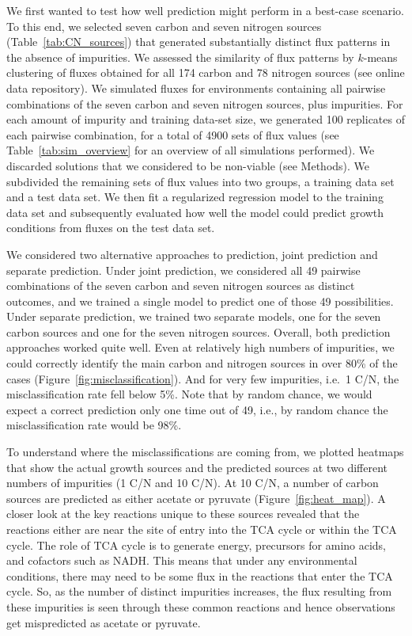 \documentclass[12pt]{article}
\begin{document}
We first wanted to test how well prediction might perform in a best-case scenario. To this end, we selected seven carbon and seven nitrogen sources (Table~\ref{tab:CN_sources}) that generated substantially distinct flux patterns in the absence of impurities. We assessed the similarity of flux patterns by $k$-means clustering of fluxes obtained for all 174 carbon and 78 nitrogen sources (see online data repository). We simulated fluxes for environments containing all pairwise combinations of the seven carbon and seven nitrogen sources, plus impurities. For each amount of impurity and training data-set size, we generated 100 replicates of each pairwise combination, for a total of 4900 sets of flux values (see Table~\ref{tab:sim_overview} for an overview of all simulations performed). We discarded solutions that we considered to be non-viable (see Methods). We subdivided the remaining sets of flux values into two groups, a training data set and a test data set. We then fit a regularized regression model to the training data set and subsequently evaluated how well the model could predict growth conditions from fluxes on the test data set.

We considered two alternative approaches to prediction, joint prediction and separate prediction. Under joint prediction, we considered all 49 pairwise combinations of the seven carbon and seven nitrogen sources as distinct outcomes, and we trained a single model to predict one of those 49 possibilities. Under separate prediction, we trained two separate models, one for the seven carbon sources and one for the seven nitrogen sources. Overall, both prediction approaches worked quite well.  Even at relatively high numbers of impurities, we could correctly identify the main carbon and nitrogen sources in over 80\% of the cases (Figure~\ref{fig:misclassification}).  And for very few impurities, i.e.\ 1 C/N, the misclassification rate fell below 5\%. Note that by random chance, we would expect a correct prediction only one time out of 49, i.e., by random chance the misclassification rate would be 98\%.

To understand where the misclassifications are coming from, we plotted heatmaps that show the actual growth sources and the predicted sources at two different numbers of impurities (1 C/N and 10 C/N). At 10 C/N, a number of carbon sources are predicted as either acetate or pyruvate (Figure~\ref{fig:heat_map}). A closer look at the key reactions unique to these sources revealed that the reactions either are near the site of entry into the TCA cycle or within the TCA cycle. The role of TCA cycle is to generate energy, precursors for amino acids, and cofactors such as NADH.  This means that under any environmental conditions, there may need to be some flux in the reactions that enter the TCA cycle. So, as the number of distinct impurities increases, the flux resulting from these impurities is seen through these common reactions and hence observations get mispredicted as acetate or pyruvate. 
\end{document}
